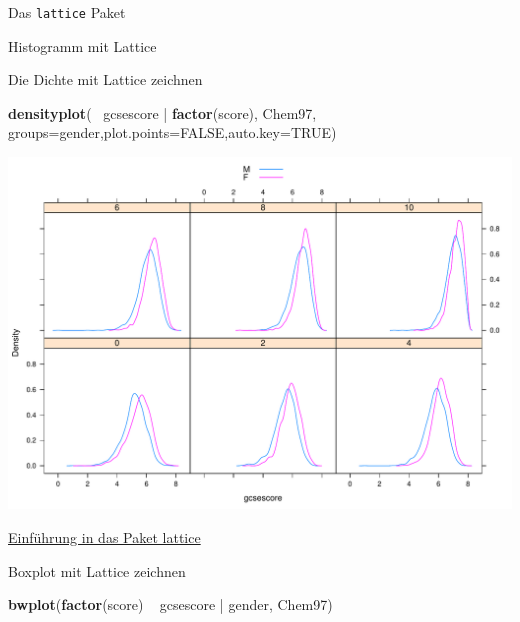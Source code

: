 \documentclass[ignorenonframetext,]{beamer}
\newenvironment{Shaded}{}{}
\newcommand{\KeywordTok}[1]{\textcolor[rgb]{0.00,0.44,0.13}{\textbf{{#1}}}}
\newcommand{\DataTypeTok}[1]{\textcolor[rgb]{0.56,0.13,0.00}{{#1}}}
\newcommand{\StringTok}[1]{\textcolor[rgb]{0.25,0.44,0.63}{{#1}}}
\newcommand{\OtherTok}[1]{\textcolor[rgb]{0.00,0.44,0.13}{{#1}}}
\newcommand{\NormalTok}[1]{{#1}}
\begin{document}
\begin{frame}[fragile]{Das \texttt{lattice} Paket}
\begin{block}{Histogramm mit Lattice}
\end{block}

\begin{block}{Die Dichte mit Lattice zeichnen}

\begin{Shaded}
\begin{Highlighting}[]
\KeywordTok{densityplot}\NormalTok{(~}\StringTok{ }\NormalTok{gcsescore |}\StringTok{ }\KeywordTok{factor}\NormalTok{(score), Chem97, }
    \DataTypeTok{groups=}\NormalTok{gender,}\DataTypeTok{plot.points=}\OtherTok{FALSE}\NormalTok{,}\DataTypeTok{auto.key=}\OtherTok{TRUE}\NormalTok{)}
\end{Highlighting}
\end{Shaded}

\includegraphics{R_intern_files/figure-beamer/unnamed-chunk-222-1.pdf}

\href{http://www.isid.ac.in/~deepayan/R-tutorials/labs/04_lattice_lab.pdf}{Einführung
in das Paket lattice}

\end{block}

\begin{block}{Boxplot mit Lattice zeichnen}

\begin{Shaded}
\begin{Highlighting}[]
\KeywordTok{bwplot}\NormalTok{(}\KeywordTok{factor}\NormalTok{(score) ~}\StringTok{ }\NormalTok{gcsescore |}\StringTok{ }\NormalTok{gender, Chem97)}
\end{Highlighting}
\end{Shaded}


\end{block}
\end{frame}
\end{document}
